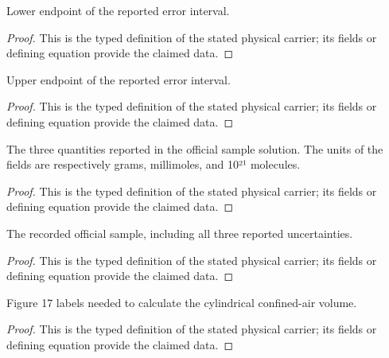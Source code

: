 \begin{definition}
  \label{def:physics:IPhO_2026_4_A_1:aux011}
  Lower endpoint of the reported error interval.
\end{definition}
\begin{proof}
  This is the typed definition of the stated physical carrier; its fields or defining equation provide the claimed data.
\end{proof}

\begin{definition}
  \label{def:physics:IPhO_2026_4_A_1:aux012}
  Upper endpoint of the reported error interval.
\end{definition}
\begin{proof}
  This is the typed definition of the stated physical carrier; its fields or defining equation provide the claimed data.
\end{proof}

\begin{definition}
  \label{def:physics:IPhO_2026_4_A_1:aux013}
  The three quantities reported in the official sample solution. The units of the fields are respectively grams, millimoles, and 10²¹ molecules.
\end{definition}
\begin{proof}
  This is the typed definition of the stated physical carrier; its fields or defining equation provide the claimed data.
\end{proof}

\begin{definition}
  \label{def:physics:IPhO_2026_4_A_1:aux014}
  The recorded official sample, including all three reported uncertainties.
\end{definition}
\begin{proof}
  This is the typed definition of the stated physical carrier; its fields or defining equation provide the claimed data.
\end{proof}

\begin{definition}
  \label{def:physics:IPhO_2026_4_A_1:aux015}
  Figure 17 labels needed to calculate the cylindrical confined-air volume.
\end{definition}
\begin{proof}
  This is the typed definition of the stated physical carrier; its fields or defining equation provide the claimed data.
\end{proof}

